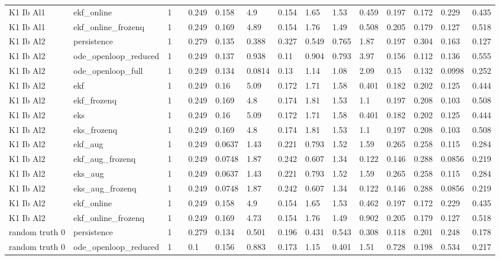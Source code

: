 \begin{table}[t]
\begin{tabular}{lllllllllllllll}
K1 Ib Al1 & ekf\_online & 1 &  & 0.249 & 0.158 & 4.9 & 0.154 & 1.65 & 1.53 & 0.459 & 0.197 & 0.172 & 0.229 & 0.435 \\
K1 Ib Al1 & ekf\_online\_frozenq & 1 &  & 0.249 & 0.169 & 4.89 & 0.154 & 1.76 & 1.49 & 0.508 & 0.205 & 0.179 & 0.127 & 0.518 \\
K1 Ib Al2 & persistence & 1 &  & 0.279 & 0.135 & 0.388 & 0.327 & 0.549 & 0.765 & 1.87 & 0.197 & 0.304 & 0.163 & 0.127 \\
K1 Ib Al2 & ode\_openloop\_reduced & 1 &  & 0.249 & 0.137 & 0.938 & 0.11 & 0.904 & 0.793 & 3.97 & 0.156 & 0.112 & 0.136 & 0.555 \\
K1 Ib Al2 & ode\_openloop\_full & 1 &  & 0.249 & 0.134 & 0.0814 & 0.13 & 1.14 & 1.08 & 2.09 & 0.15 & 0.132 & 0.0998 & 0.252 \\
K1 Ib Al2 & ekf & 1 &  & 0.249 & 0.16 & 5.09 & 0.172 & 1.71 & 1.58 & 0.401 & 0.182 & 0.202 & 0.125 & 0.444 \\
K1 Ib Al2 & ekf\_frozenq & 1 &  & 0.249 & 0.169 & 4.8 & 0.174 & 1.81 & 1.53 & 1.1 & 0.197 & 0.208 & 0.103 & 0.508 \\
K1 Ib Al2 & eks & 1 &  & 0.249 & 0.16 & 5.09 & 0.172 & 1.71 & 1.58 & 0.401 & 0.182 & 0.202 & 0.125 & 0.444 \\
K1 Ib Al2 & eks\_frozenq & 1 &  & 0.249 & 0.169 & 4.8 & 0.174 & 1.81 & 1.53 & 1.1 & 0.197 & 0.208 & 0.103 & 0.508 \\
K1 Ib Al2 & ekf\_aug & 1 &  & 0.249 & 0.0637 & 1.43 & 0.221 & 0.793 & 1.52 & 1.59 & 0.265 & 0.258 & 0.115 & 0.284 \\
K1 Ib Al2 & ekf\_aug\_frozenq & 1 &  & 0.249 & 0.0748 & 1.87 & 0.242 & 0.607 & 1.34 & 0.122 & 0.146 & 0.288 & 0.0856 & 0.219 \\
K1 Ib Al2 & eks\_aug & 1 &  & 0.249 & 0.0637 & 1.43 & 0.221 & 0.793 & 1.52 & 1.59 & 0.265 & 0.258 & 0.115 & 0.284 \\
K1 Ib Al2 & eks\_aug\_frozenq & 1 &  & 0.249 & 0.0748 & 1.87 & 0.242 & 0.607 & 1.34 & 0.122 & 0.146 & 0.288 & 0.0856 & 0.219 \\
K1 Ib Al2 & ekf\_online & 1 &  & 0.249 & 0.158 & 4.9 & 0.154 & 1.65 & 1.53 & 0.462 & 0.197 & 0.172 & 0.229 & 0.435 \\
K1 Ib Al2 & ekf\_online\_frozenq & 1 &  & 0.249 & 0.169 & 4.73 & 0.154 & 1.76 & 1.49 & 0.902 & 0.205 & 0.179 & 0.127 & 0.518 \\
random truth 0 & persistence & 1 &  & 0.279 & 0.134 & 0.501 & 0.196 & 0.431 & 0.543 & 0.308 & 0.118 & 0.201 & 0.248 & 0.178 \\
random truth 0 & ode\_openloop\_reduced & 1 &  & 0.1 & 0.156 & 0.883 & 0.173 & 1.15 & 0.401 & 1.51 & 0.728 & 0.198 & 0.534 & 0.217 \\

\end{tabular}
\end{table}
